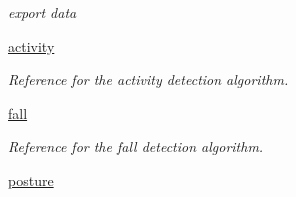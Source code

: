 \begin{DoxyCompactItemize}
\begin{DoxyCompactList}\small\item\em export data \end{DoxyCompactList}\item 
\hyperlink{classmain_1_1_main_window_a79bfc498bc7afae5335f0afa0457424c}{activity}
\begin{DoxyCompactList}\small\item\em Reference for the activity detection algorithm. \end{DoxyCompactList}\item 
\hyperlink{classmain_1_1_main_window_ac77d273e1ae89b15533af18cd3501efa}{fall}
\begin{DoxyCompactList}\small\item\em Reference for the fall detection algorithm. \end{DoxyCompactList}\item 
\hypertarget{classmain_1_1_main_window_a3cff3a6070c66ac5b036f882101c4e6c}{\hyperlink{classmain_1_1_main_window_a3cff3a6070c66ac5b036f882101c4e6c}{posture}}\label{classmain_1_1_main_window_a3cff3a6070c66ac5b036f882101c4e6c}


\end{DoxyCompactItemize}
